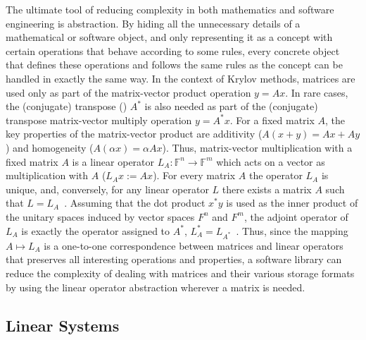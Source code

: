 The ultimate tool of reducing complexity in both mathematics and software
engineering is abstraction. By hiding all the unnecessary details of a
mathematical or software object, and only representing it as a concept with
certain operations that behave according to some rules, every concrete object
that defines these operations and follows the same rules as the concept can be
handled in exactly the same way. In the context of Krylov methods, matrices are
used only as part of the matrix-vector product operation $y = Ax$. In rare
cases, the (conjugate) transpose () $A^*$ is also needed
as part of the (conjugate) transpose matrix-vector multiply operation $y =
A^*x$. For a fixed matrix $A$, the key properties of the matrix-vector product
are additivity ($A(x+y) = Ax + Ay$) and homogeneity ($A(\alpha x) = \alpha Ax$).
Thus, matrix-vector multiplication with a fixed matrix $A$ is a linear operator
$L_A : \mathbb{F}^n \rightarrow \mathbb{F}^m$ which acts on a vector as
multiplication with $A$ ($L_Ax := Ax$). For every matrix $A$ the operator $L_A$
is unique, and, conversely, for any linear operator $L$ there exists a matrix
$A$ such that $L = L_A$~\cite{la}. Assuming that the dot product $x^*y$ is used
as the inner product of the unitary spaces induced by vector spaces $F^n$ and
$F^m$, the adjoint operator of $L_A$ is exactly the operator assigned to $A^*$,
\ie $L_A^* = L_{A^*}^{}$~\cite{la}. Thus, since the mapping $A \mapsto L_A$ is a
one-to-one correspondence between matrices and linear operators that preserves
all interesting operations and properties, a software library can reduce the
complexity of dealing with matrices and their various storage formats by using
the linear operator abstraction wherever a matrix is needed.

\subsection{Linear Systems}

